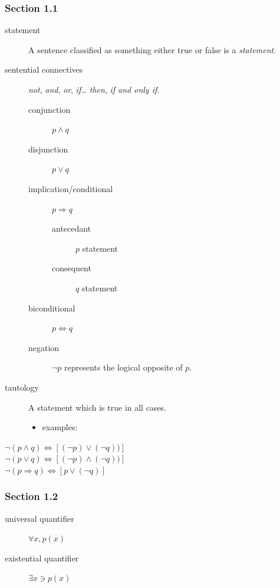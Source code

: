 \documentclass[12pt]{article}
\begin{document}
\subsubsection{Section 1.1}
\label{sec:orgde5c4b2}
\begin{description}
\item[{statement}] A sentence classified as something either true or false is a
\emph{statement}.
\item[{sentential connectives}] \emph{not}, \emph{and}, \emph{or}, \emph{if\dots{} then}, \emph{if and only if}.
\begin{description}
\item[{conjunction}] \(p\land{}q\)
\item[{disjunction}] \(p\lor{}q\)
\item[{implication/conditional}] \(p\Rightarrow{}q\)
\begin{description}
\item[{antecedant}] \(p\) statement
\item[{consequent}] \(q\) statement
\end{description}
\item[{biconditional}] \(p\Leftrightarrow{}q\)
\item[{negation}] \(\neg{}p\) represents the logical opposite of \(p\).
\end{description}
\item[{tautology}] A statement which is true in all cases.
\begin{itemize}
\item examples:
\end{itemize}
\end{description}
\begin{center}
\(\neg(p\land{}q)\Leftrightarrow[(\neg{}p)\lor(\neg{}q))]\) \\
\(\neg(p\lor{}q)\Leftrightarrow[(\neg{}p)\land(\neg{}q))]\) \\
\(\neg(p\Rightarrow{}q)\Leftrightarrow[p\lor(\neg{}q)]\) \\
\end{center}

\subsubsection{Section 1.2}
\label{sec:orgcf8068e}
\begin{description}
\item[{universal quantifier}] \(\forall{}x,p(x)\)
\item[{existential quantifier}] \(\exists{}x\ni{}p(x)\)
\end{description}
\end{document}
